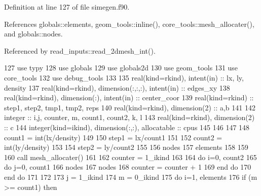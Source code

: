 Definition at line 127 of file simegen.\+f90.



References globals\+::elements, geom\+\_\+tools\+::inline(), core\+\_\+tools\+::mesh\+\_\+allocater(), and globals\+::nodes.



Referenced by read\+\_\+inputs\+::read\+\_\+2dmesh\+\_\+int().


\begin{DoxyCode}
127       \textcolor{keywordtype}{use }typy
128       \textcolor{keywordtype}{use }globals
129       \textcolor{keywordtype}{use }globals2d
130       \textcolor{keywordtype}{use }geom_tools
131       \textcolor{keywordtype}{use }core_tools
132       \textcolor{keywordtype}{use }debug_tools
133 
135       \textcolor{keywordtype}{real(kind=rkind)}, \textcolor{keywordtype}{intent(in)} :: lx, ly, density
137       \textcolor{keywordtype}{real(kind=rkind)}, \textcolor{keywordtype}{dimension(:,:,:)}, \textcolor{keywordtype}{intent(in)} :: edges\_xy
138       \textcolor{keywordtype}{real(kind=rkind)}, \textcolor{keywordtype}{dimension(:)}, \textcolor{keywordtype}{intent(in)} :: center\_coor
139       \textcolor{keywordtype}{real(kind=rkind)} :: step1, step2, tmp1, tmp2, reps
140       \textcolor{keywordtype}{real(kind=rkind)}, \textcolor{keywordtype}{dimension(2)} :: a,b
141       
142       \textcolor{keywordtype}{integer} :: i,j, counter, m, count1, count2, k, l
143       \textcolor{keywordtype}{real(kind=rkind)}, \textcolor{keywordtype}{dimension(2)} :: c
144       \textcolor{keywordtype}{integer(kind=ikind)}, \textcolor{keywordtype}{dimension(:,:)}, \textcolor{keywordtype}{allocatable} :: cpus
145       
146       
147 
148       count1 = int(lx/density)
149       
150       step1 = lx/count1
151       
152       count2 = int(ly/density)
153       
154       step2 = ly/count2
155       
156       nodes%
157       elements%
158       
159 
160       \textcolor{keyword}{call }mesh_allocater()
161 
162       counter = 1\_ikind
163       
164       \textcolor{keywordflow}{do} i=0, count2
165         \textcolor{keywordflow}{do} j=0, count1
166           nodes%
167           nodes%
168           counter = counter + 1
169 \textcolor{keywordflow}{        end do}
170 \textcolor{keywordflow}{      end do}
171       
172 
173       j = 1\_ikind
174       m = 0\_ikind
175       \textcolor{keywordflow}{do} i=1, elements%
176         \textcolor{keywordflow}{if} (m >= count1) \textcolor{keywordflow}{then}

\end{DoxyCode}
